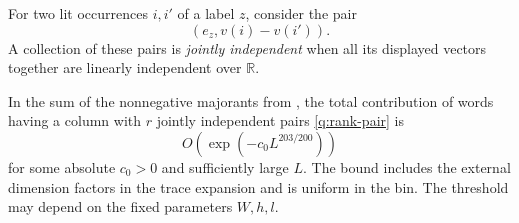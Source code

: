 For two lit occurrences $i,i'$ of a label $z$, consider the pair
\begin{equation}\label{q:rank-pair}
 (e_z,v(i)-v(i')).
\end{equation}
A collection of these pairs is \emph{jointly independent} when all
its displayed vectors together are linearly independent over
$\mathbb R$.

\begin{lemma}\label{q:rank}
In the sum of the nonnegative majorants from
, the total contribution of words having a
column with $r$ jointly independent pairs \eqref{q:rank-pair} is
\[
 O\left(\exp(-c_0 L^{203/200})\right)
\]
for some absolute $c_0>0$ and sufficiently large $L$.
The bound includes the external dimension factors in the trace
expansion and is uniform in the bin.  The threshold may depend on the
fixed parameters $W,h,l$.
\end{lemma}

